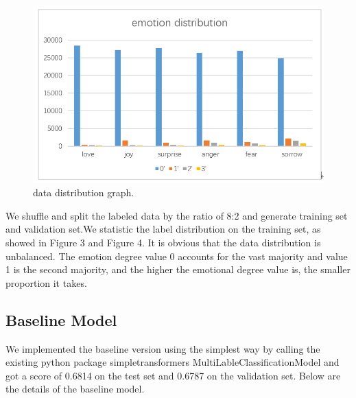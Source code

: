 \documentclass[12pt,twocolumn,letterpaper]{article}
\begin{document}
\begin{figure}
\begin{center}
\includegraphics[scale=0.35]{emotion distribution.png}
\end{center}
   \caption{data distribution graph.}
\label{fig:short}
\end{figure}
We shuffle and split the labeled data  by the ratio of 8:2 and generate training set and validation set.We statistic the label distribution on the training set, as showed in Figure 3 and Figure 4. It is obvious that the data distribution is unbalanced. The emotion degree value 0 accounts for the vast majority and value 1 is the second majority, and the higher the emotional degree value is, the smaller proportion it takes. 



\subsection{Baseline Model}

We implemented the baseline version using the simplest way by calling the existing python package simpletransformers MultiLableClassificationModel and got a score of 0.6814 on the test set and 0.6787 on the validation set. Below are the details of the baseline model.
\end{document}
